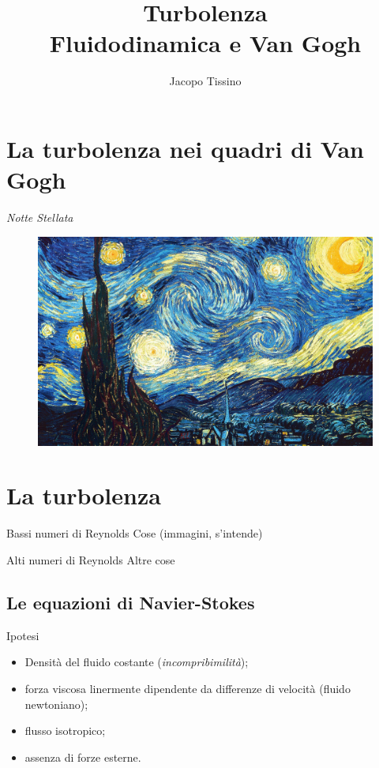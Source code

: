 \documentclass[11pt]{beamer}
\author{Jacopo Tissino}
\title{Turbolenza\\
Fluidodinamica e Van Gogh}
\institute{Liceo Scientifico ``M. Grigoletti''}
\begin{document}
\begin{frame}
\titlepage
\end{frame}

\begin{frame}
\tableofcontents
\end{frame}

\section{La turbolenza nei quadri di Van Gogh}

\begin{frame}{\emph{Notte Stellata}}
\begin{figure}
\centering
\includegraphics[scale=0.11]{the-starry-night-1889.jpg}
\end{figure}
\end{frame}

\section{La turbolenza}

\begin{frame}{Bassi numeri di Reynolds}
Cose (immagini, s'intende)
\end{frame}

\begin{frame}{Alti numeri di Reynolds}
Altre cose
\end{frame}

\subsection{Le equazioni di Navier-Stokes}

\begin{frame}{Ipotesi}
\begin{itemize}
\item Densità del fluido costante (\emph{incompribimilità});
\item forza viscosa linermente dipendente da differenze di velocità (fluido newtoniano);
\item flusso isotropico;
\item assenza di forze esterne.
\end{itemize}
\end{frame}
\end{document}
